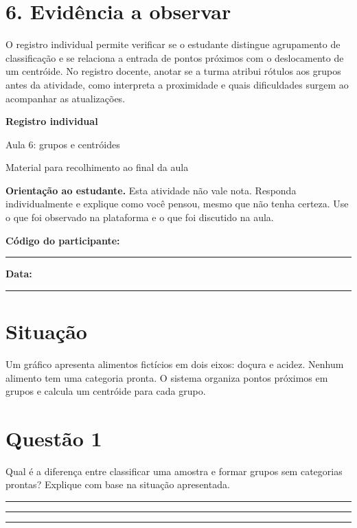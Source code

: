 \documentclass[12pt,a4paper]{article}
\newcommand{\linha}{\rule{\linewidth}{0.35pt}}
\newcommand{\bloco}[1]{%
  \vspace{0.25em}
  \noindent\colorbox{cinza}{\parbox{0.96\linewidth}{#1}}%
  \vspace{0.3em}
}
\begin{document}
\section*{6. Evidência a observar}

O registro individual permite verificar se o estudante distingue agrupamento de classificação e se relaciona a entrada de pontos próximos com o deslocamento de um centróide. No registro docente, anotar se a turma atribui rótulos aos grupos antes da atividade, como interpreta a proximidade e quais dificuldades surgem ao acompanhar as atualizações.

\newpage

\begin{center}
  {\LARGE\bfseries\color{azul} Registro individual}\par
  \vspace{0.2em}
  {\large Aula 6: grupos e centróides}\par
  \vspace{0.35em}
  {\small Material para recolhimento ao final da aula}\par
\end{center}

\bloco{\textbf{Orientação ao estudante.} Esta atividade não vale nota. Responda individualmente e explique como você pensou, mesmo que não tenha certeza. Use o que foi observado na plataforma e o que foi discutido na aula.}

\textbf{Código do participante:} \rule{5cm}{0.4pt}
\hfill
\textbf{Data:} \rule{3cm}{0.4pt}

\section*{Situação}

Um gráfico apresenta alimentos fictícios em dois eixos: doçura e acidez. Nenhum alimento tem uma categoria pronta. O sistema organiza pontos próximos em grupos e calcula um centróide para cada grupo.

\section*{Questão 1}

Qual é a diferença entre classificar uma amostra e formar grupos sem categorias prontas? Explique com base na situação apresentada.

\vspace{0.25em}
\linha\par\vspace{0.75em}
\linha\par\vspace{0.75em}
\linha
\end{document}
